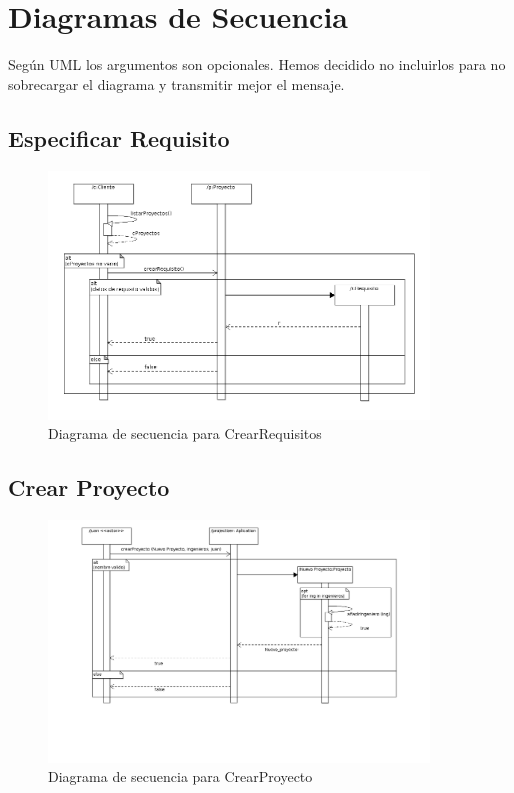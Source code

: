 \documentclass[a4paper, spanish]{article}
\begin{document}
\section{Diagramas de Secuencia}
Según UML los argumentos son opcionales.
Hemos decidido no incluirlos para no sobrecargar el diagrama y transmitir mejor el mensaje.

\subsection{Especificar Requisito} %
\begin{figure}[h!]
\centering
\includegraphics[width=0.9\textwidth]{diagramas/diagramasSecuencia/CrearRequisito_sd.png}
\caption{Diagrama de secuencia para CrearRequisitos}
\end{figure}


\subsection{Crear Proyecto} %
\begin{figure}[h!]
\centering
\includegraphics[width=0.9\textwidth]{diagramas/diagramasSecuencia/CrearProyecto_sd.png}
\caption{Diagrama de secuencia para CrearProyecto}
\end{figure}
\end{document}
